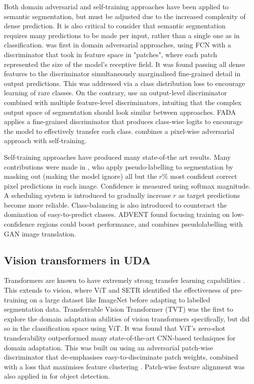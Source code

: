 \documentclass[a4paper,12pt]{report}
\begin{document}
Both domain adversarial and self-training approaches have been applied to semantic segmentation, but must be adjusted due to the increased complexity of dense prediction. It is also critical to consider that semantic segmentation requires many predictions to be made per input, rather than a single one as in classification. \cite{hoffman_fcns_2016} was first in domain adversarial approaches, using FCN with a discriminator that took in feature space in "patches", where each patch represented the size of the model's receptive field. It was found passing all dense features to the discriminator simultaneously marginalised fine-grained detail in output predictions. This was addressed via a class distribution loss to encourage learning of rare classes. On the contrary, \cite{tsai_learning_2020} use an output-level discriminator combined with multiple feature-level discriminators, intuiting that the complex output space of segmentation should look similar between approaches. FADA \cite{wang_classes_2020} applies a fine-grained discriminator that produces class-wise logits to encourage the model to effectively transfer each class. \cite{michieli_adversarial_2020} combines a pixel-wise adversarial approach with self-training.

Self-training approaches have produced many state-of-the art results. Many contributions were made in \cite{zou_domain_2018}, who apply pseudo-labelling to segmentation by masking out (making the model ignore) all but the $r\%$ most confident correct pixel predictions in each image. Confidence is measured using softmax magnitude. A scheduling system is introduced to gradually increase $r$ as target predictions become more reliable. Class-balancing is also introduced to counteract the domination of easy-to-predict classes. ADVENT \cite{vu_advent_2019} found focusing training on low-confidence regions could boost performance, and \cite{li_bidirectional_2019} combines pseudolabelling with GAN image translation.

\subsection*{Vision transformers in UDA}

Transformers are known to have extremely strong transfer learning capabilities \cite{radford_language_2019} \cite{wright_transformer_2020}. This extends to vision, where ViT \cite{dosovitskiy_image_2021} and SETR \cite{zheng_rethinking_2021} identified the effectiveness of pre-training on a large dataset like ImageNet before adapting to labelled segmentation data. Transferrable Vision Transformer (TVT) \cite{yang_tvt_2021} was the first to explore the domain adaptation abilities of vision transformers specifically, but did so in the classification space using ViT. It was found that ViT's zero-shot transferability outperformed many state-of-the-art CNN-based techniques for domain adaptation. This was built on using an adversarial patch-wise discriminator that de-emphasises easy-to-disciminate patch weights, combined with a loss that maximises feature clustering \cite{chapelle_semi-supervised_2005}. Patch-wise feature alignment was also applied in \cite{wang_exploring_2021} for object detection.
\end{document}
